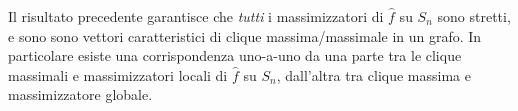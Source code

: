 \newpage

Il risultato precedente garantisce che \emph{tutti} i massimizzatori di $\hat{f}$ su $S_n$ sono stretti, e sono sono vettori caratteristici di clique massima/massimale in un grafo. In particolare esiste una corrispondenza uno-a-uno da una parte tra le clique massimali e massimizzatori locali di $\hat{f}$ su $S_n$, dall'altra tra clique massima e massimizzatore globale.



